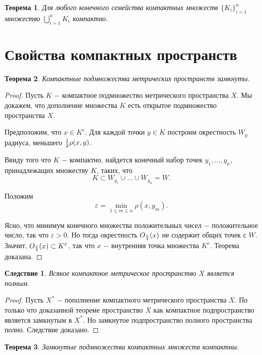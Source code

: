 \documentclass{article}
\newtheorem{theorem}{Теорема}[section]
\newtheorem*{consequence}{Следствие}
\begin{document}
\begin{theorem}
Для любого конечного семейства компактных множеств \(\{K_i\}_{i=1}^n\) множество \(\bigcup\limits_{i=1}^{n}K_i\) компактно.
\end{theorem}

\section{Свойства компактных пространств}

\begin{theorem}
Компактные подмножества метрических пространств замкнуты.
\end{theorem}

\begin{proof}
Пусть \(K\) \(-\) компактное подмножество метрического пространства \(X\). Мы докажем, что дополнение множества \(K\) есть открытое подмножество пространства \(X\).

Предположим, что \(x \in K^c\). Для каждой точки \(y \in K\) построим окрестность \(W_y\) радиуса, меньшего \({1 \over 2}\rho(x, y)\).

Ввиду того что \(K\) \(-\) компактно, найдется конечный набор точек \(y_1, ..., y_n\), принадлежащих множеству \(K\), таких, что
\[
K \subset W_{y_1} \cup ... \cup W_{y_n} = W.
\]

Положим
\[
\varepsilon = \min_{1 \leq m \leq n}{\rho(x, y_m)}.
\]

Ясно, что минимум конечного множества положительных чисел \(-\) положительное число, так что \(\varepsilon > 0\). Но тогда окрестность \(O_{\varepsilon \over 2}(x)\) не содержит общих точек с \(W\). Значит, \(O_{\varepsilon \over 2}(x) \subset K^c\), так что \(x\) \(-\) внутренняя точка множества \(K^c\). Теорема доказана.
\end{proof}

\begin{consequence}
Всякое компактное метрическое пространство \(X\) является полным.
\end{consequence}

\begin{proof}
Пусть \(X^*\) \(-\) пополнение компактного метрического пространства \(X\). По только что доказанной теореме пространство \(X\) как компактное подпространство является замкнутым в \(X^*\). Но замкнутое подпространство полного пространства полно. Следствие доказано.
\end{proof}

\begin{theorem}
Замкнутые подмножества компактных множеств компактны.
\end{theorem}
\end{document}
